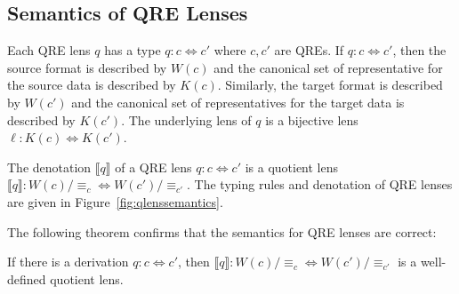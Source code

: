 \documentclass{svproc}
\newcommand{\eqrel}[1]{\ensuremath{\equiv_{#1}}}
\begin{document}

\subsection{Semantics of QRE Lenses}
Each QRE lens $q$ has a type $q : c \Leftrightarrow c'$ where $c, c'$ are QREs.
If $q : c \Leftrightarrow c'$, then the source format is described by $W(c)$ and
the canonical set of representative for the source data is described by $K(c)$.
Similarly, the target format is described by $W(c')$ and the canonical set of
representatives for the target data is described by $K(c')$. The underlying lens
of $q$ is a bijective lens $\ell : K(c) \Leftrightarrow K(c')$.

The denotation $\llbracket q \rrbracket$ of a QRE lens $q:c \Leftrightarrow c'$
is a quotient lens $\llbracket q \rrbracket : W(c)/{\eqrel{c}}
\Longleftrightarrow W(c')/{\eqrel{c'}}$. The typing rules and denotation of QRE
lenses are given in Figure~\ref{fig:qlenssemantics}.

The following theorem confirms that the semantics for QRE lenses are correct:
\begin{theorem}
If there is a derivation $q : c \Leftrightarrow c'$, then $\llbracket q
\rrbracket : W(c)/{\eqrel{c}} \Leftrightarrow W(c')/{\eqrel{c'}}$ is a
well-defined quotient lens.
\end{theorem}
\end{document}
